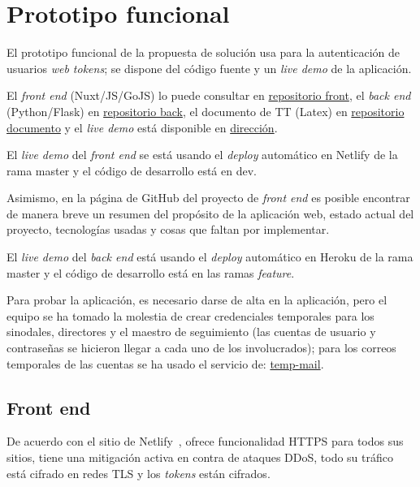 \section{Prototipo funcional}

El prototipo funcional de la propuesta de solución usa para la autenticación de usuarios \textit{web tokens}; se dispone del código fuente y un \textit{live demo} de la aplicación.


El \textit{front end} (Nuxt/JS/GoJS) lo puede consultar en \href{https://github.com/martinez-acosta/TT-2019-B052}{repositorio front}, el \textit{back end} (Python/Flask) en \href{https://github.com/omaraparicio07/api-tt-2019-b052}{repositorio back}, el documento de TT (Latex) en \href{https://github.com/martinez-acosta/DOCS-TT-2019-B052}{repositorio documento} y el \textit{live demo} está disponible en \href{https://serene-haibt-2239b4.netlify.app/}{dirección}.


El \textit{live demo} del \textit{front end} se está usando el \textit{deploy} automático en Netlify de la rama master y el código de desarrollo está en dev.


Asimismo, en la página de GitHub del proyecto de \textit{front end} es posible encontrar de manera breve un resumen del propósito de la aplicación web, estado actual del proyecto, tecnologías usadas y cosas que faltan por implementar.


El \textit{live demo} del \textit{back end} está usando el \textit{deploy} automático en Heroku de la rama master y el código de desarrollo está en las ramas \textit{feature}.


Para probar la aplicación, es necesario darse de alta en la aplicación, pero el equipo se ha tomado la molestia de crear credenciales temporales para los sinodales, directores y el maestro de seguimiento (las cuentas de usuario y contraseñas se hicieron llegar a cada uno de los involucrados); para los correos temporales de las cuentas se ha usado el servicio de: \href{https://temp-mail.org/es/}{temp-mail}.

\subsection*{Front end}

De acuerdo con el sitio de Netlify~\cite{netlify_netlify_nodate}, ofrece funcionalidad HTTPS para todos sus sitios, tiene una mitigación activa en contra de ataques DDoS, todo su tráfico está cifrado en redes TLS y los \textit{tokens} están cifrados.

